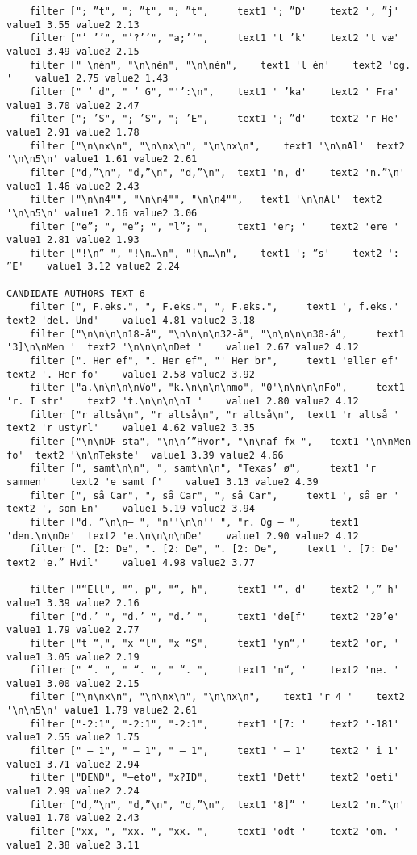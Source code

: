 {\begin{verbatim}
	filter ["; ”t", "; ”t", "; ”t", 	text1 '; ”D'	text2 ', ”j'	value1 3.55	value2 2.13
	filter ["’ ’’", "’?’’", "a;’’", 	text1 't ’k'	text2 't væ'	value1 3.49	value2 2.15
	filter [" \nén", "\n\nén", "\n\nén", 	text1 'l én'	text2 'og. '	value1 2.75	value2 1.43
	filter [" ’ d", " ’ G", "'’:\n", 	text1 ' ’ka'	text2 ' Fra'	value1 3.70	value2 2.47
	filter ["; ’S", "; ’S", "; ’E", 	text1 '; ”d'	text2 'r He'	value1 2.91	value2 1.78
	filter ["\n\nx\n", "\n\nx\n", "\n\nx\n", 	text1 '\n\nAl'	text2 '\n\n5\n'	value1 1.61	value2 2.61
	filter ["d,”\n", "d,”\n", "d,”\n", 	text1 'n, d'	text2 'n.”\n'	value1 1.46	value2 2.43
	filter ["\n\n4"", "\n\n4"", "\n\n4"", 	text1 '\n\nAl'	text2 '\n\n5\n'	value1 2.16	value2 3.06
	filter ["e”; ", "e”; ", "l”; ", 	text1 'er; '	text2 'ere '	value1 2.81	value2 1.93
	filter ["!\n” ", "!\n…\n", "!\n…\n", 	text1 '; ”s'	text2 ': ”E'	value1 3.12	value2 2.24

CANDIDATE AUTHORS TEXT 6
	filter [", F.eks.", ", F.eks.", ", F.eks.", 	text1 ', f.eks.'	text2 'del. Und'	value1 4.81	value2 3.18
	filter ["\n\n\n\n18-å", "\n\n\n\n32-å", "\n\n\n\n30-å", 	text1 '3]\n\nMen '	text2 '\n\n\n\nDet '	value1 2.67	value2 4.12
	filter [". Her ef", ". Her ef", "' Her br", 	text1 'eller ef'	text2 '. Her fo'	value1 2.58	value2 3.92
	filter ["a.\n\n\n\nVo", "k.\n\n\n\nmo", "0'\n\n\n\nFo", 	text1 'r. I str'	text2 't.\n\n\n\nI '	value1 2.80	value2 4.12
	filter ["r altså\n", "r altså\n", "r altså\n", 	text1 'r altså '	text2 'r ustyrl'	value1 4.62	value2 3.35
	filter ["\n\nDF sta", "\n\n’”Hvor", "\n\naf fx ", 	text1 '\n\nMen fo'	text2 '\n\nTekste'	value1 3.39	value2 4.66
	filter [", samt\n\n", ", samt\n\n", "Texas’ ø", 	text1 'r sammen'	text2 'e samt f'	value1 3.13	value2 4.39
	filter [", så Car", ", så Car", ", så Car", 	text1 ', så er '	text2 ', som En'	value1 5.19	value2 3.94
	filter ["d. ”\n\n– ", "n''\n\n'' ", "r. Og – ", 	text1 'den.\n\nDe'	text2 'e.\n\n\n\nDe'	value1 2.90	value2 4.12
	filter [". [2: De", ". [2: De", ". [2: De", 	text1 '. [7: De'	text2 'e.” Hvil'	value1 4.98	value2 3.77

	filter ["“Ell", "“, p", "“, h", 	text1 '“, d'	text2 ',” h'	value1 3.39	value2 2.16
	filter ["d.’ ", "d.’ ", "d.’ ", 	text1 'de[f'	text2 '20’e'	value1 1.79	value2 2.77
	filter ["t “,", "x “l", "x “S", 	text1 'yn“,'	text2 'or, '	value1 3.05	value2 2.19
	filter [" “. ", " “. ", " “. ", 	text1 'n“, '	text2 'ne. '	value1 3.00	value2 2.15
	filter ["\n\nx\n", "\n\nx\n", "\n\nx\n", 	text1 'r 4 '	text2 '\n\n5\n'	value1 1.79	value2 2.61
	filter ["-2:1", "-2:1", "-2:1", 	text1 '[7: '	text2 '-181'	value1 2.55	value2 1.75
	filter [" – 1", " – 1", " – 1", 	text1 ' – 1'	text2 ' i 1'	value1 3.71	value2 2.94
	filter ["DEND", "–eto", "x?ID", 	text1 'Dett'	text2 'oeti'	value1 2.99	value2 2.24
	filter ["d,”\n", "d,”\n", "d,”\n", 	text1 '8]” '	text2 'n.”\n'	value1 1.70	value2 2.43
	filter ["xx, ", "xx. ", "xx. ", 	text1 'odt '	text2 'om. '	value1 2.38	value2 3.11


\end{verbatim}}
